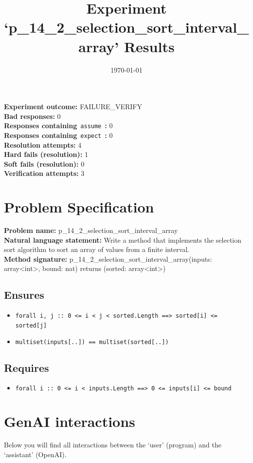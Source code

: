 \documentclass{article}
\begin{document}
\title{Experiment `p\_14\_2\_selection\_sort\_interval\_array' Results}
\author{\today}
\date{}
\maketitle
\textbf{Experiment outcome: }FAILURE\_VERIFY
\\\textbf{Bad responses: }0
\\\textbf{Responses containing}~\texttt{assume}~\textbf{: }0
\\\textbf{Responses containing}~\texttt{expect}~\textbf{: }0
\\\textbf{Resolution attempts: }4
\\\textbf{Hard fails (resolution): }1
\\\textbf{Soft fails (resolution): }0
\\\textbf{Verification attempts: }3
\section*{Problem Specification}
\textbf{Problem name: }p\_14\_2\_selection\_sort\_interval\_array
\\\textbf{Natural language statement: }Write a method that implements the selection sort algorithm to sort an array of values from a finite interval.
\\\textbf{Method signature: }p\_14\_2\_selection\_sort\_interval\_array(inputs: array<int>, bound: nat) returns (sorted: array<int>)
\subsection*{Ensures}
\begin{itemize}
\item \texttt{forall i, j :: 0 <= i < j < sorted.Length ==> sorted[i] <= sorted[j]}
\item \texttt{multiset(inputs[..]) == multiset(sorted[..])}
\end{itemize}
\subsection*{Requires}
\begin{itemize}
\item \texttt{forall i :: 0 <= i < inputs.Length ==> 0 <= inputs[i] <= bound}
\end{itemize}
\clearpage
\section*{GenAI interactions}
Below you will find all interactions between the `user' (program) and the `assistant' (OpenAI).
\end{document}
